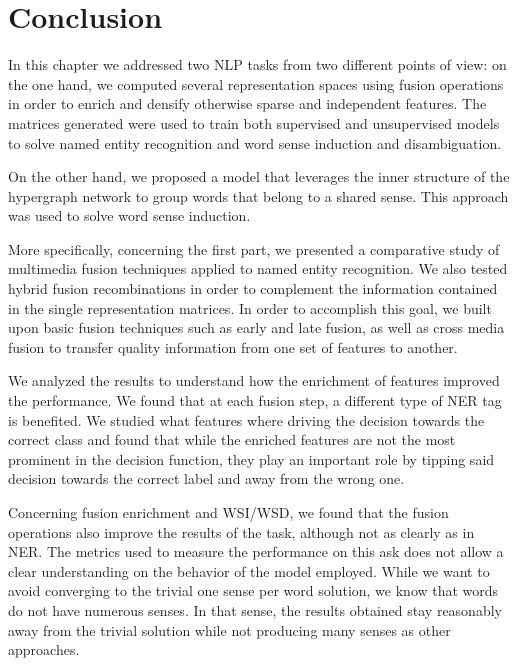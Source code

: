 \section{Conclusion}
\label{chap6:conclusion}
In this chapter we addressed two NLP tasks from two different points of view: on the one hand, we computed several representation spaces using fusion operations in order to enrich and densify otherwise sparse and independent features. The matrices generated were used to train both supervised and unsupervised models to solve named entity recognition and word sense induction and disambiguation.

On the other hand, we proposed a model that leverages the inner structure of the hypergraph network to group words that belong to a shared sense. This approach was used to solve word sense induction.

More specifically, concerning the first part, we presented  a comparative study of multimedia fusion techniques applied to named entity recognition.  We also tested hybrid fusion recombinations in order to complement the information contained in the single representation matrices. In order to accomplish this goal, we built upon basic fusion techniques such as early and late fusion, as well as cross media fusion to transfer quality information from one set of features to another. 


We analyzed the results to understand how the enrichment of features improved the performance. We found that at each fusion step, a different type of NER tag is benefited. We studied what features where driving the decision towards the correct class and found that while the enriched features are not the most prominent  in the decision function, they play an important role by tipping said decision towards the correct label and away from the wrong one. 

Concerning fusion enrichment and WSI/WSD, we found that the fusion operations also improve the results of the task, although not as clearly as in NER. The metrics used to measure the performance on this ask does not allow a clear understanding on the behavior of the model employed. While we want to avoid converging to the trivial one sense per word solution, we know that words do not have numerous senses. In that sense, the results obtained stay reasonably away from the trivial solution while not producing many senses as other approaches.

